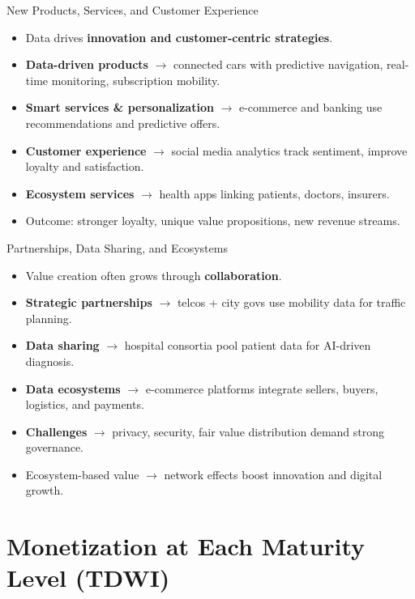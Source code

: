 \documentclass[aspectratio=169, table]{beamer}
\begin{document}
\begin{frame}{\LARGE{New Products, Services, and Customer Experience}}
	\vspace{15pt}
	\begin{itemize}
		\item Data drives \textbf{innovation and customer-centric strategies}.  
		\item \textbf{Data-driven products} $\rightarrow$ connected cars with predictive navigation, real-time monitoring, subscription mobility.  
		\item \textbf{Smart services \& personalization} $\rightarrow$ e-commerce and banking use recommendations and predictive offers.  
		\item \textbf{Customer experience} $\rightarrow$ social media analytics track sentiment, improve loyalty and satisfaction.  
		\item \textbf{Ecosystem services} $\rightarrow$ health apps linking patients, doctors, insurers.  
		\item Outcome: stronger loyalty, unique value propositions, new revenue streams.  
	\end{itemize}
\end{frame}

\begin{frame}{Partnerships, Data Sharing, and Ecosystems}
	\vspace{15pt}
	\begin{itemize}
		\item Value creation often grows through \textbf{collaboration}.  
		\item \textbf{Strategic partnerships} $\rightarrow$ telcos + city govs use mobility data for traffic planning.  
		\item \textbf{Data sharing} $\rightarrow$ hospital consortia pool patient data for AI-driven diagnosis.  
		\item \textbf{Data ecosystems} $\rightarrow$ e-commerce platforms integrate sellers, buyers, logistics, and payments.  
		\item \textbf{Challenges} $\rightarrow$ privacy, security, fair value distribution demand strong governance.  
		\item Ecosystem-based value $\rightarrow$ network effects boost innovation and digital growth.  
	\end{itemize}
\end{frame}

\section{Monetization at Each Maturity Level (TDWI)}
\end{document}
